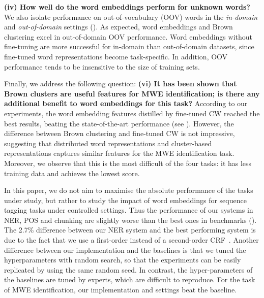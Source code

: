 \textbf{(iv) How well do the word embeddings perform for unknown words?}
We also isolate performance on out-of-vocabulary (OOV) words 
in the \textit{in-domain} and \textit{out-of-domain} settings ().
As expected, word embeddings and Brown clustering excel in out-of-domain OOV performance.
Word embeddings without\nss{[with?]} fine-tuning are more successful for 
in-domain than out-of-domain datasets, since fine-tuned
word representations become task-specific. 
In addition, OOV performance tends to be insensitive to the size of training sets.



Finally, we address the following question: \textbf{(vi) It has been shown that Brown clusters are useful features for MWE identification; is there any additional benefit to word embeddings for this task?} 
According to our experiments, the word embedding features distilled by fine-tuned CW reached the best results, beating the state-of-the-art performance (see ).
However, the difference between Brown clustering and fine-tuned CW is not impressive, suggesting that distributed word representations and cluster-based representations captures similar features for the MWE identification task. Moreover, we observe that this is the most difficult of the four tasks: it has less training data and achieves the lowest score.


In this paper, we do not aim to maximise the absolute performance of the tasks under 
study, but rather to study the impact of word embeddings for sequence tagging tasks under controlled settings. Thus the performance of our systems in NER, POS and chunking are slightly worse than the best ones in benchmarks (). The 2.7\% difference between our NER system and the best performing system is due to the fact that we use a first-order instead of a second-order CRF~\cite{Ando:2005}. 
Another difference between our implementation and the baselines is that we tuned the hyperparameters with random search, so that the experiments can be easily replicated by using the same random seed. In contrast, the hyper-parameters of the baselines are tuned by experts, which are difficult to reproduce. For the task of MWE identification, our implementation and settings beat the baseline.




